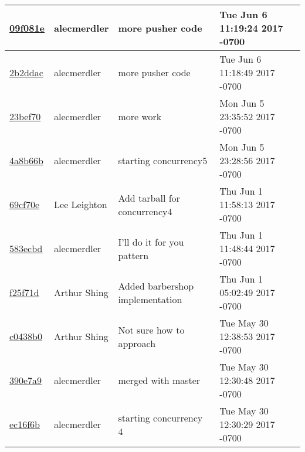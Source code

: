 \begin{tabular}{l l l l}
\href{https://github.com/alecmerdler/cs-444-group-119/commit/09f081eba62c5193144d3c17234b4bfa527d36de}{09f081e} & alecmerdler & more pusher code & Tue Jun 6 11:19:24 2017 -0700\\\hline
\href{https://github.com/alecmerdler/cs-444-group-119/commit/2b2ddac696610404faf0a860808d26c4415ad19e}{2b2ddac} & alecmerdler & more pusher code & Tue Jun 6 11:18:49 2017 -0700\\\hline
\href{https://github.com/alecmerdler/cs-444-group-119/commit/23bef706b9aa65a8a6c150131ec8baa2c97ce181}{23bef70} & alecmerdler & more work & Mon Jun 5 23:35:52 2017 -0700\\\hline
\href{https://github.com/alecmerdler/cs-444-group-119/commit/4a8b66bf7c19f0edef2378adf32d3f473b3a6abf}{4a8b66b} & alecmerdler & starting concurrency5 & Mon Jun 5 23:28:56 2017 -0700\\\hline
\href{https://github.com/alecmerdler/cs-444-group-119/commit/69cf70e6130d3129f7754feedf61ba70ed5453f8}{69cf70e} & Lee Leighton & Add tarball for concurrency4 & Thu Jun 1 11:58:13 2017 -0700\\\hline
\href{https://github.com/alecmerdler/cs-444-group-119/commit/583ecbdff859096a4521cf0b86a25b3ef0121b2e}{583ecbd} & alecmerdler & I'll do it for you pattern & Thu Jun 1 11:48:44 2017 -0700\\\hline
\href{https://github.com/alecmerdler/cs-444-group-119/commit/f25f71d59d6fe961e77c659c54655b57acb4765e}{f25f71d} & Arthur Shing & Added barbershop implementation & Thu Jun 1 05:02:49 2017 -0700\\\hline
\href{https://github.com/alecmerdler/cs-444-group-119/commit/c0438b035bac02f4a0b2bc5c5789690eabb88d0d}{c0438b0} & Arthur Shing & Not sure how to approach & Tue May 30 12:38:53 2017 -0700\\\hline
\href{https://github.com/alecmerdler/cs-444-group-119/commit/390e7a9b7c0fd15d4c15d2d6042b00ac2550266d}{390e7a9} & alecmerdler & merged with master & Tue May 30 12:30:48 2017 -0700\\\hline
\href{https://github.com/alecmerdler/cs-444-group-119/commit/ec16f6bf04069d333fec28f2014be9c952733564}{ec16f6b} & alecmerdler & starting concurrency 4 & Tue May 30 12:30:29 2017 -0700\\\hline\end{tabular}

